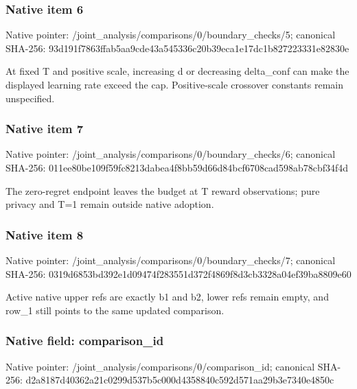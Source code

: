 \documentclass[10pt,a4paper]{article}
\begin{document}
\subsubsection{Native item 6}
Native pointer: /joint\_\allowbreak{}analysis/comparisons/0/boundary\_\allowbreak{}checks/5; canonical SHA-256: 93d191f7863ffab5aa9cde43a545336c20b39eca1e17dc1b827223331e82830e

\begingroup\raggedright\sloppy At fixed T and positive scale,\allowbreak{} increasing d or decreasing delta\_\allowbreak{}conf can make the displayed learning rate exceed the cap. Positive-scale crossover constants remain unspecified.\par\endgroup

\subsubsection{Native item 7}
Native pointer: /joint\_\allowbreak{}analysis/comparisons/0/boundary\_\allowbreak{}checks/6; canonical SHA-256: 011ee80be109f59fc8213dabea4f8bb59d66d84bcf6708cad598ab78cbf34f4d

\begingroup\raggedright\sloppy The zero-regret endpoint leaves the budget at T reward observations;\allowbreak{} pure privacy and T=\allowbreak{}1 remain outside native adoption.\par\endgroup

\subsubsection{Native item 8}
Native pointer: /joint\_\allowbreak{}analysis/comparisons/0/boundary\_\allowbreak{}checks/7; canonical SHA-256: 0319d6853bd392e1d09474f283551d372f4869f8d3cb3328a04ef39ba8809e60

\begingroup\raggedright\sloppy Active native upper refs are exactly b1 and b2,\allowbreak{} lower refs remain empty,\allowbreak{} and row\_\allowbreak{}1 still points to the same updated comparison.\par\endgroup

\subsubsection{Native field: comparison\_\allowbreak{}id}
Native pointer: /joint\_\allowbreak{}analysis/comparisons/0/comparison\_\allowbreak{}id; canonical SHA-256: d2a8187d40362a21c0299d537b5c000d4358840c592d571aa29b3e7340e4850c
\end{document}
